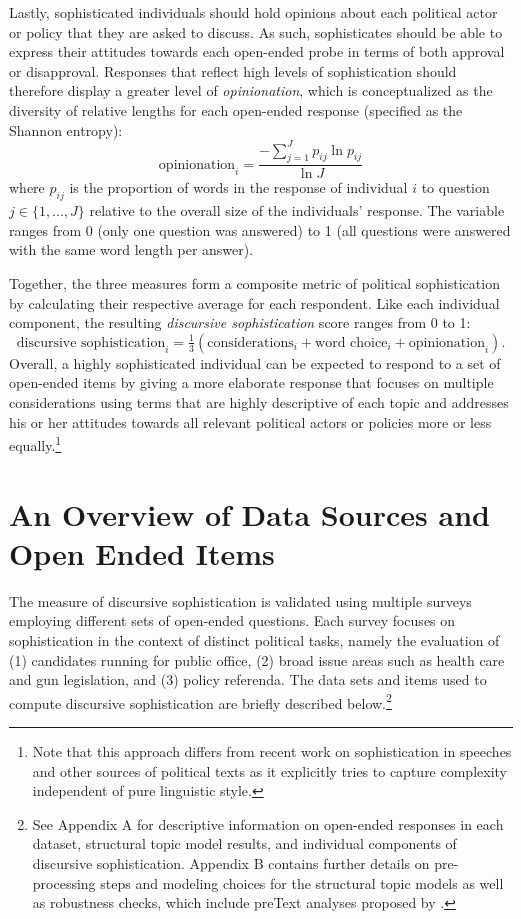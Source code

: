 Lastly, sophisticated individuals should hold opinions about each political actor or policy that they are asked to discuss. As such, sophisticates should be able to express their attitudes towards each open-ended probe in terms of both approval or disapproval. Responses that reflect high levels of sophistication should therefore display a greater level of \textit{opinionation}, which is conceptualized as the diversity of relative lengths for each open-ended response (specified as the Shannon entropy):
\begin{equation}
\text{opinionation}_i = \dfrac{-\sum_{j=1}^J p_{ij} \ln p_{ij}}{\ln J}
\end{equation}
where $p_{ij}$ is the proportion of words in the response of individual $i$ to question $j\in \{1,...,J\}$ relative to the overall size of the individuals' response. The variable ranges from 0 (only one question was answered) to 1 (all questions were answered with the same word length per answer).

Together, the three measures form a composite metric of political sophistication by calculating their respective average for each respondent. Like each individual component, the resulting \textit{discursive sophistication} score ranges from 0 to 1:
\begin{equation}
\text{discursive sophistication}_i = \tfrac{1}{3}(\text{considerations}_i + \text{word choice}_i + \text{opinionation}_i).
\end{equation}
Overall, a highly sophisticated individual can be expected to respond to a set of open-ended items by giving a more elaborate response that focuses on multiple considerations using terms that are highly descriptive of each topic and addresses his or her attitudes towards all relevant political actors or policies more or less equally.\footnote{Note that this approach differs from recent work on sophistication in speeches and other sources of political texts \citep[e.g.,][]{spirling2016democratization,benoit2017measuring} as it explicitly tries to capture complexity independent of pure linguistic style.}


\section*{An Overview of Data Sources and Open Ended Items}

The measure of discursive sophistication is validated using multiple surveys employing different sets of open-ended questions. Each survey focuses on sophistication in the context of distinct political tasks, namely the evaluation of (1) candidates running for public office, (2) broad issue areas such as health care and gun legislation, and (3) policy referenda. The data sets and items used to compute discursive sophistication are briefly described below.\footnote{See Appendix A for descriptive information on open-ended responses in each dataset, structural topic model results, and individual components of discursive sophistication. Appendix B contains further details on pre-processing steps and modeling choices for the structural topic models as well as robustness checks, which include preText analyses proposed by \citet{denny2018text}.}


